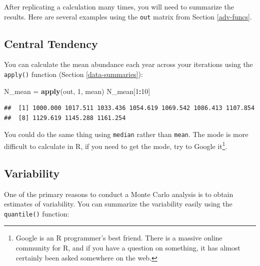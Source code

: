\documentclass[]{book}
\newenvironment{Shaded}{\begin{snugshade}}{\end{snugshade}}
\newcommand{\KeywordTok}[1]{\textcolor[rgb]{0.13,0.29,0.53}{\textbf{#1}}}
\newcommand{\DecValTok}[1]{\textcolor[rgb]{0.00,0.00,0.81}{#1}}
\newcommand{\FloatTok}[1]{\textcolor[rgb]{0.00,0.00,0.81}{#1}}
\newcommand{\StringTok}[1]{\textcolor[rgb]{0.31,0.60,0.02}{#1}}
\newcommand{\CommentTok}[1]{\textcolor[rgb]{0.56,0.35,0.01}{\textit{#1}}}
\newcommand{\ControlFlowTok}[1]{\textcolor[rgb]{0.13,0.29,0.53}{\textbf{#1}}}
\newcommand{\OperatorTok}[1]{\textcolor[rgb]{0.81,0.36,0.00}{\textbf{#1}}}
\newcommand{\NormalTok}[1]{#1}
\let\rmarkdownfootnote\footnote%
\def\footnote{\protect\rmarkdownfootnote}
\theoremstyle{definition}
\theoremstyle{definition}
\theoremstyle{definition}
\theoremstyle{remark}
\begin{document}
After replicating a calculation many times, you will need to summarize
the results. Here are several examples using the \texttt{out} matrix
from Section \ref{adv-funcs}.

\subsection{Central Tendency}\label{central-tendency}

You can calculate the mean abundance each year across your iterations
using the \texttt{apply()} function (Section \ref{data-summaries}):

\begin{Shaded}
\begin{Highlighting}[]
\NormalTok{N_mean =}\StringTok{ }\KeywordTok{apply}\NormalTok{(out, }\DecValTok{1}\NormalTok{, mean)}
\NormalTok{N_mean[}\DecValTok{1}\OperatorTok{:}\DecValTok{10}\NormalTok{]}
\end{Highlighting}
\end{Shaded}

\begin{verbatim}
##  [1] 1000.000 1017.511 1033.436 1054.619 1069.542 1086.413 1107.854
##  [8] 1129.619 1145.288 1161.254
\end{verbatim}

You could do the same thing using \texttt{median} rather than
\texttt{mean}. The mode is more difficult to calculate in R, if you need
to get the mode, try to Google it\footnote{Google is an R programmer's
  best friend. There is a massive online community for R, and if you
  have a question on something, it has almost certainly been asked
  somewhere on the web.}.

\subsection{Variability}\label{variability}

One of the primary reasons to conduct a Monte Carlo analysis is to
obtain estimates of variability. You can summarize the variability
easily using the \texttt{quantile()} function:

\begin{Shaded}
\end{Shaded}
\end{document}
